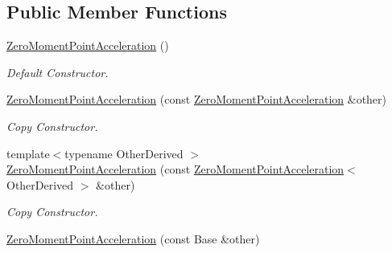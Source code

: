 \subsection*{Public Member Functions}
\begin{DoxyCompactItemize}
\item 
\hyperlink{classow__core_1_1ZeroMomentPointAcceleration_a223d68f387fcaec22891710b6839641a}{Zero\+Moment\+Point\+Acceleration} ()\hypertarget{classow__core_1_1ZeroMomentPointAcceleration_a223d68f387fcaec22891710b6839641a}{}\label{classow__core_1_1ZeroMomentPointAcceleration_a223d68f387fcaec22891710b6839641a}

\begin{DoxyCompactList}\small\item\em Default Constructor. \end{DoxyCompactList}\item 
\hyperlink{classow__core_1_1ZeroMomentPointAcceleration_a9477dab91432778dbac74bcbafe93bfb}{Zero\+Moment\+Point\+Acceleration} (const \hyperlink{classow__core_1_1ZeroMomentPointAcceleration}{Zero\+Moment\+Point\+Acceleration} \&other)\hypertarget{classow__core_1_1ZeroMomentPointAcceleration_a9477dab91432778dbac74bcbafe93bfb}{}\label{classow__core_1_1ZeroMomentPointAcceleration_a9477dab91432778dbac74bcbafe93bfb}

\begin{DoxyCompactList}\small\item\em Copy Constructor. \end{DoxyCompactList}\item 
{\footnotesize template$<$typename Other\+Derived $>$ }\\\hyperlink{classow__core_1_1ZeroMomentPointAcceleration_a56876f8e4d3b3216a7a7ff4c018b9c31}{Zero\+Moment\+Point\+Acceleration} (const \hyperlink{classow__core_1_1ZeroMomentPointAcceleration}{Zero\+Moment\+Point\+Acceleration}$<$ Other\+Derived $>$ \&other)\hypertarget{classow__core_1_1ZeroMomentPointAcceleration_a56876f8e4d3b3216a7a7ff4c018b9c31}{}\label{classow__core_1_1ZeroMomentPointAcceleration_a56876f8e4d3b3216a7a7ff4c018b9c31}

\begin{DoxyCompactList}\small\item\em Copy Constructor. \end{DoxyCompactList}\item 
\hyperlink{classow__core_1_1ZeroMomentPointAcceleration_a2fd0002281656c2fe91fff231ac8a314}{Zero\+Moment\+Point\+Acceleration} (const Base \&other)\hypertarget{classow__core_1_1ZeroMomentPointAcceleration_a2fd0002281656c2fe91fff231ac8a314}{}\label{classow__core_1_1ZeroMomentPointAcceleration_a2fd0002281656c2fe91fff231ac8a314}


\end{DoxyCompactItemize}
